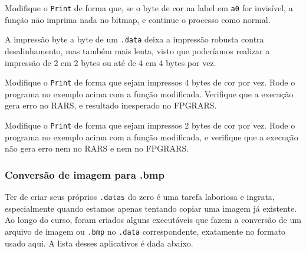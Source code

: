 \documentclass[10pt, a4paper, twoside]{article}
\begin{document}
      \begin{exercicio}
        Modifique o {\tt Print} de forma que, se o byte de cor na label em {\tt a0} for invisível, a função não imprima nada no bitmap, e continue o processo como normal.
      \end{exercicio}
      \begin{remark}
        A impressão byte a byte de um {\tt .data} deixa a impressão robusta contra desalinhamento, mas também mais lenta, visto que poderíamos realizar a impressão de 2 em 2 bytes ou até de 4 em 4 bytes por vez.
      \end{remark}
      \begin{exercicio}
        Modifique o {\tt Print} de forma que sejam impressos 4 bytes de cor por vez.
        Rode o programa no exemplo acima com a função modificada. Verifique que a execução gera erro no RARS, e resultado inesperado no FPGRARS.
      \end{exercicio}
      \begin{exercicio}
        Modifique o {\tt Print} de forma que sejam impressos 2 bytes de cor por vez.
        Rode o programa no exemplo acima com a função modificada, e verifique que a execução não gera erro nem no RARS e nem no FPGRARS.
      \end{exercicio}
      
      \subsubsection{Conversão de imagem para .bmp}
        Ter de criar seus próprios {\tt .datas} do zero é uma tarefa laboriosa e ingrata, especialmente quando estamos apenas tentando copiar uma imagem já existente.
        Ao longo do curso, foram criados alguns executáveis que fazem a conversão de um arquivo de imagem ou {\tt .bmp} no {\tt .data} correspondente, exatamente no formato usado aqui.
        A lista desses aplicativos é dada abaixo.
        
\end{document}
